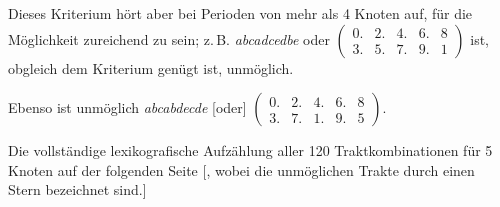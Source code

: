 Dieses Kriterium hört aber bei Perioden von mehr als 4 Knoten auf, für
die Möglichkeit zureichend zu sein; z.\,B. \emph{abcadcedbe} oder
$\left(\begin{array}{ccccc}0. & 2. & 4. & 6. & 8 \\ 3. & 5. & 7. & 9. & 1\end{array}\right)$
ist, obgleich dem Kriterium genügt ist, unmöglich.

Ebenso ist unmöglich \emph{abcabdecde} [oder]
$\left(\begin{array}{ccccc}0. & 2. & 4. & 6. & 8 \\ 3. & 7. & 1. & 9. & 5\end{array}\right)$.

Die vollständige lexikografische Aufzählung aller 120 Traktkombinationen
für 5 Knoten auf der folgenden Seite [, wobei die unmöglichen Trakte durch
einen Stern bezeichnet sind.]
